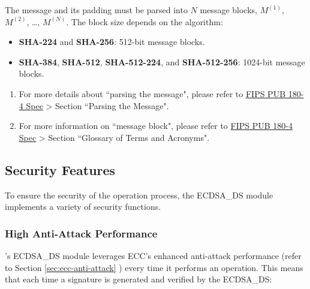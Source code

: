 \documentclass[main\_\_EN.tex]{subfiles}
\begin{document}
The message and its padding must be parsed into \begin{math}N\end{math} message blocks, \begin{math}M^{(1)}\end{math}, \begin{math}M^{(2)}\end{math}, \dots, \begin{math}M^{(N)}\end{math}. The block size depends on the algorithm:

\begin{itemize}
    \item \textbf{SHA-224} and \textbf{SHA-256}: 512-bit message blocks.
    \item \textbf{SHA-384}, \textbf{SHA-512}, \textbf{SHA-512-224}, and \textbf{SHA-512-256}: 1024-bit message blocks.
\end{itemize}

\begin{tiplisting}
\begin{enumerate}
\vspace{-2.5em}
    \item For more details about ``parsing the message", please refer to \href{https://doi.org/10.6028/NIST.FIPS.180-4}{FIPS PUB 180-4 Spec} > Section ``Parsing the Message".
    \item For more information on ``message block", please refer to \href{https://doi.org/10.6028/NIST.FIPS.180-4}{FIPS PUB 180-4 Spec} > Section ``Glossary of Terms and Acronyms".
\end{enumerate}
\end{tiplisting}



\subsection{Security Features}
\label{sec:ecdsa-security_features}

To ensure the security of the operation process, the ECDSA\_DS module implements a variety of security functions.

\subsubsection{High Anti-Attack Performance}

\chipseries{}'s ECDSA\_DS module leverages ECC's enhanced anti-attack performance (refer to Section \ref{sec:ecc-anti-attack} \textit{}) every time it performs an operation. This means that each time a signature is generated and verified by the ECDSA\_DS:
\end{document}
